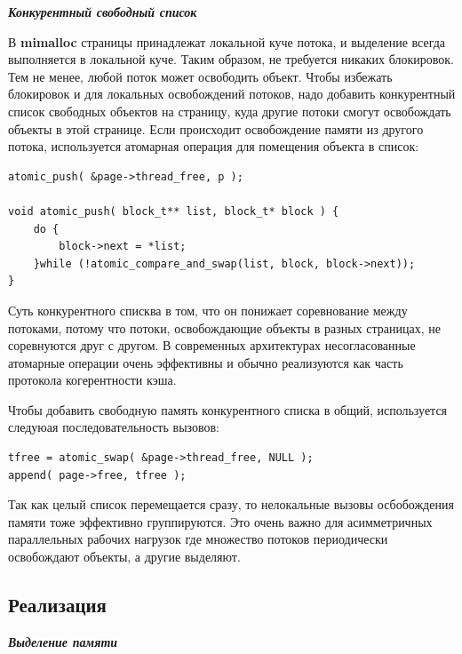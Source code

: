 \bigbreak
\textit{\textbf{Конкурентный свободный список}}

В \textbf{mimalloc} страницы принадлежат локальной куче потока, и выделение всегда выполняется в локальной куче. Таким образом, не требуется никаких блокировок. Тем не менее, любой поток может освободить объект. Чтобы избежать блокировок и для локальных освобождений потоков, надо добавить конкурентный список свободных объектов на страницу, куда другие потоки смогут освобождать объекты в этой странице. Если происходит освобождение памяти из другого потока, используется атомарная операция для помещения объекта в список:

\begin{lstlisting}
atomic_push( &page->thread_free, p );

void atomic_push( block_t** list, block_t* block ) {
	do {
		block->next = *list;
	}while (!atomic_compare_and_swap(list, block, block->next));
}
\end{lstlisting}

Суть конкурентного списква в том, что он понижает соревнование между потоками, потому что потоки, освобождающие объекты в разных страницах, не соревнуются друг с другом. В современных архитектурах несогласованные атомарные операции очень эффективны и обычно реализуются как часть протокола когерентности кэша.

Чтобы добавить свободную память конкурентного списка в общий, используется следуюая последовательность вызовов:
\begin{lstlisting}
tfree = atomic_swap( &page->thread_free, NULL );
append( page->free, tfree );
\end{lstlisting}

Так как целый список перемещается сразу, то нелокальные вызовы осбобождения памяти тоже эффективно группируются. Это очень важно для асимметричных параллельных рабочих нагрузок где множество потоков периодически освобождают объекты, а другие выделяют.

\subsection{Реализация}

\bigbreak
\textit{\textbf{Выделение памяти}}


